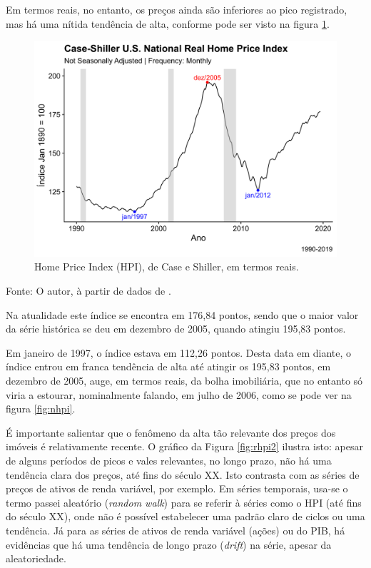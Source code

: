 \documentclass[
	12pt,				%
	oneside,			%
	a4paper,			%
	chapter=TITLE,		%
	section=TITLE,		%
	english,			%
	brazil				%
	]{abntex2}
\newcommand{\bcenter}{\begin{center}}
\newcommand{\ecenter}{\end{center}}
\begin{document}
Em termos reais, no entanto, os preços ainda são inferiores ao pico registrado,
mas há uma nítida tendência de alta, conforme pode ser visto na figura
\ref{fig:rhpi}.
\begin{figure}[H]

{\centering \includegraphics[width=0.7\linewidth]{images/rhpi-1} 

}

\caption{Home Price Index (HPI), de Case e Shiller, em termos reais.}\label{fig:rhpi}
\end{figure}
\bcenter

Fonte: O autor, à partir de dados de \textcite{QuandlWIKI}.
\ecenter

Na atualidade este índice se encontra em 176,84 pontos, sendo
que o maior valor da série histórica se deu em dezembro de 2005, quando atingiu
195,83 pontos.

Em janeiro de 1997, o índice estava em 112,26 pontos.
Desta data em diante, o índice entrou em franca tendência de alta até atingir os
195,83 pontos, em dezembro de 2005, auge, em termos
reais, da bolha imobiliária, que no entanto só viria a estourar, nominalmente
falando, em julho de 2006, como se pode ver na figura \ref{fig:nhpi}.

É importante salientar que o fenômeno da alta tão relevante dos preços dos
imóveis é relativamente recente. O gráfico da Figura \ref{fig:rhpi2} ilustra
isto: apesar de alguns períodos de picos e vales relevantes, no longo prazo, não
há uma tendência clara dos preços, até fins do século XX. Isto contrasta com as
séries de preços de ativos de renda variável, por exemplo. Em séries temporais,
usa-se o termo passei aleatório (\emph{random walk}) para se referir à séries como o
HPI (até fins do século XX), onde não é possível estabelecer uma padrão claro de
ciclos ou uma tendência. Já para as séries de ativos de renda variável (ações)
ou do \gls{PIB}, há evidências que há uma tendência de longo prazo (\emph{drift}) na
série, apesar da aleatoriedade.
\end{document}
